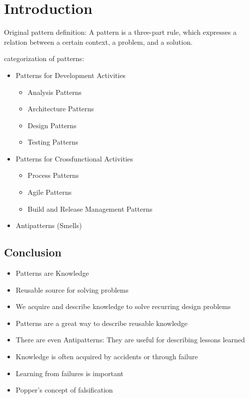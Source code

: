 
\section{Introduction}

Original pattern definition: A pattern is a three-part rule, which expresses a relation between a certain context, a problem, and a solution.

categorization of patterns:
\begin{itemize}
	\item Patterns for Development Activities
		\begin{itemize}
			\item Analysis Patterns
			\item Architecture Patterns
			\item Design Patterns
			\item Testing Patterns
		\end{itemize}
	\item Patterns for Crossfunctional Activities
		\begin{itemize}
			\item Process Patterns
			\item Agile Patterns
			\item Build and Release Management Patterns
		\end{itemize}
	\item Antipatterns (Smells)
\end{itemize}

\subsection{Conclusion}

\begin{itemize}
	\item  Patterns are Knowledge
	\item  Reusable source for solving problems
	\item  We acquire and describe knowledge to solve
	recurring design problems
	\item  Patterns are a great way to describe reusable
	knowledge
	\item  There are even Antipatterns: They are useful for
	describing lessons learned
	\item  Knowledge is often acquired by accidents or
	through failure
	\item  Learning from failures is important
	\item  Popper’s concept of falsification
\end{itemize}
\newpage
